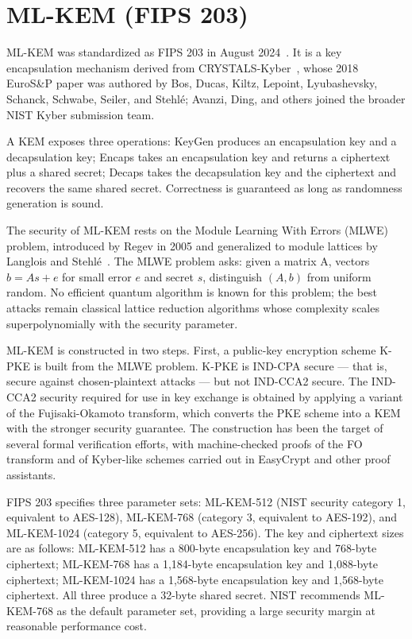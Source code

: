 \section{ML-KEM (FIPS 203)}

ML-KEM was standardized as FIPS 203 in August 2024~\cite{fips203}. It is a key encapsulation mechanism derived from CRYSTALS-Kyber~\cite{bos2018crystals}, whose 2018 EuroS\&P paper was authored by Bos, Ducas, Kiltz, Lepoint, Lyubashevsky, Schanck, Schwabe, Seiler, and Stehl\'{e}; Avanzi, Ding, and others joined the broader NIST Kyber submission team.

A KEM exposes three operations: KeyGen produces an encapsulation key and a decapsulation key; Encaps takes an encapsulation key and returns a ciphertext plus a shared secret; Decaps takes the decapsulation key and the ciphertext and recovers the same shared secret. Correctness is guaranteed as long as randomness generation is sound.

The security of ML-KEM rests on the Module Learning With Errors (MLWE) problem, introduced by Regev in 2005 and generalized to module lattices by Langlois and Stehlé~\cite{langlois2015worst}. The MLWE problem asks: given a matrix A, vectors $b = As + e$ for small error $e$ and secret $s$, distinguish $(A, b)$ from uniform random. No efficient quantum algorithm is known for this problem; the best attacks remain classical lattice reduction algorithms whose complexity scales superpolynomially with the security parameter.

ML-KEM is constructed in two steps. First, a public-key encryption scheme K-PKE is built from the MLWE problem. K-PKE is IND-CPA secure --- that is, secure against chosen-plaintext attacks --- but not IND-CCA2 secure. The IND-CCA2 security required for use in key exchange is obtained by applying a variant of the Fujisaki-Okamoto transform, which converts the PKE scheme into a KEM with the stronger security guarantee. The construction has been the target of several formal verification efforts, with machine-checked proofs of the FO transform and of Kyber-like schemes carried out in EasyCrypt and other proof assistants.

FIPS 203 specifies three parameter sets: ML-KEM-512 (NIST security category 1, equivalent to AES-128), ML-KEM-768 (category 3, equivalent to AES-192), and ML-KEM-1024 (category 5, equivalent to AES-256). The key and ciphertext sizes are as follows: ML-KEM-512 has a 800-byte encapsulation key and 768-byte ciphertext; ML-KEM-768 has a 1,184-byte encapsulation key and 1,088-byte ciphertext; ML-KEM-1024 has a 1,568-byte encapsulation key and 1,568-byte ciphertext. All three produce a 32-byte shared secret. NIST recommends ML-KEM-768 as the default parameter set, providing a large security margin at reasonable performance cost.

